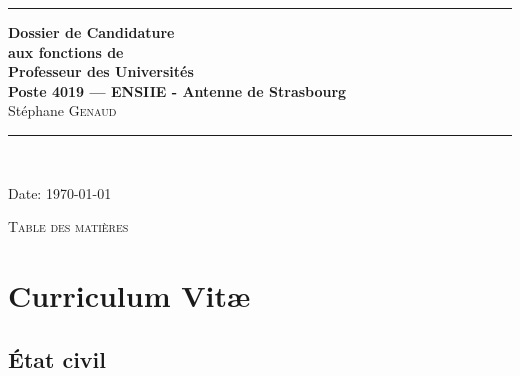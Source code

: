 \documentclass[11pt]{article}
\begin{document}
\thispagestyle{empty}




\rule{\linewidth}{1mm}
\begin{center}
\Large{\textbf{Dossier de Candidature\\
aux fonctions de \\
Professeur des Universités\\
Poste 4019 --- ENSIIE - Antenne de Strasbourg}}\\[5mm]
\Large{Stéphane \textsc{Genaud}}\\[1cm]

\rule{\linewidth}{1mm}
\\
\vspace{3cm}
\end{center}
\begin{center}
Date: \today\\
\end{center}

\newpage
\mbox{}%

\setlength{\parindent}{5mm} %
\setlength{\parindent}{0mm}
\newpage


\begin{center}
\huge{\textsc{Table des matières}}
\end{center}
\vspace{2cm}


\tableofcontents

\noindent


\newpage

\newcommand{\mysf}{\sectionfont}
\sectionfont{\sectionrule{3ex}{0pt}{-1ex}{2pt}}
\subsectionfont{\sectionrule{1ex}{0pt}{-1ex}{1pt}}


\section{Curriculum Vit{\ae}}

\setlength{\tabcolsep}{5pt}

\subsection{\'Etat civil}
\end{document}

